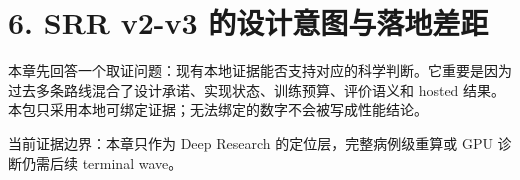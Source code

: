 \section{6. SRR v2-v3 的设计意图与落地差距}

本章先回答一个取证问题：现有本地证据能否支持对应的科学判断。它重要是因为过去多条路线混合了设计承诺、实现状态、训练预算、评价语义和 hosted 结果。本包只采用本地可绑定证据；无法绑定的数字不会被写成性能结论。



当前证据边界：本章只作为 Deep Research 的定位层，完整病例级重算或 GPU 诊断仍需后续 terminal wave。



\clearpage